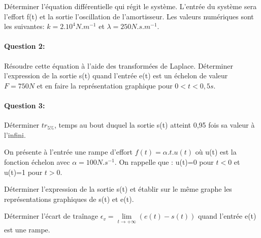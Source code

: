 Déterminer l'équation différentielle qui régit le système. L'entrée du système sera l'effort f(t) et la sortie l'oscillation de l'amortisseur. Les valeurs numériques sont les suivantes: $k=2.10^4N.m^{-1}$ et $\lambda=250N.s.m^{-1}$.

\paragraph{Question 2:}

Résoudre cette équation à l'aide des transformées de Laplace. Déterminer l'expression de la sortie s(t) quand l'entrée e(t) est un échelon de valeur $F=750N$ et en faire la représentation graphique pour $0<t<0,5s$.

\paragraph{Question 3:}

Déterminer $tr_{5\%}$, temps au bout duquel la sortie s(t) atteint 0,95 fois sa valeur à l'infini.

On présente à l'entrée une rampe d'effort $f(t)=\alpha.t.u(t)$ où u(t) est la fonction échelon avec $\alpha=100N.s^{-1}$. On rappelle que : u(t)=0 pour $t<0$ et u(t)=1 pour $t>0$.

Déterminer l'expression de la sortie s(t) et établir sur le même graphe les représentations graphiques de s(t) et e(t).

Déterminer l'écart de traînage $\epsilon_v=\lim\limits_{t \to +\infty}(e(t)-s(t))$ quand l'entrée e(t) est une rampe.

